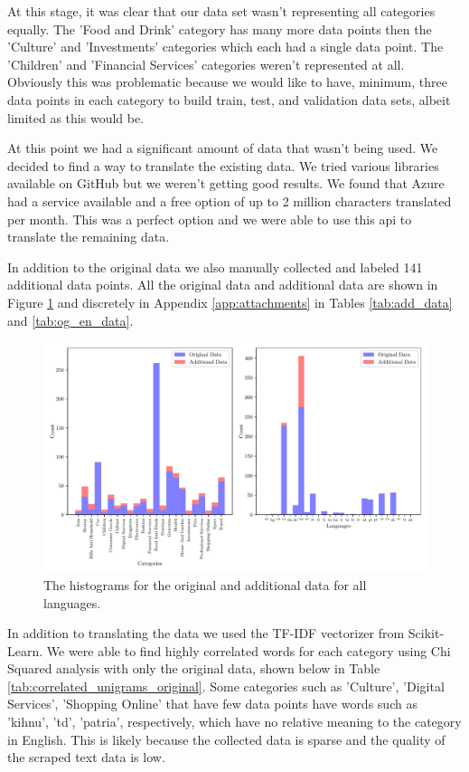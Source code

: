 At this stage, it was clear that our data set wasn't representing all categories equally. The 'Food and Drink' category has many more data points then the 'Culture' and 'Investments' categories which each had a single data point. The 'Children' and 'Financial Services' categories weren't represented at all. Obviously this was problematic because we would like to have, minimum, three data points in each category to build train, test, and validation data sets, albeit limited as this would be.

At this point we had a significant amount of data that wasn't being used. We decided to find a way to translate the existing data. We tried various libraries available on GitHub but we weren't getting good results. We found that Azure had a service available and a free option of up to 2 million characters translated per month. This was a perfect option and we were able to use this api to translate the remaining data.

In addition to the original data we also manually collected and labeled 141 additional data points. All the original data and additional data are shown in Figure \ref{fig:all_hist} and discretely in Appendix \ref{app:attachments} in Tables \ref{tab:add_data} and \ref{tab:og_en_data}.


\begin{figure}[!ht]
  \centering
  \includegraphics[width=\textwidth]{../img/plot_all_hist.pdf}
  \caption{The histograms for the original and additional data for all languages.}
  \label{fig:all_hist}
\end{figure}


In addition to translating the data we used the TF-IDF vectorizer from Scikit-Learn. We were able to find highly correlated words for each category using Chi Squared analysis with only the original data, shown below in Table \ref{tab:correlated_unigrams_original}. Some categories such as 'Culture', 'Digital Services', 'Shopping Online' that have few data points have words such as 'kihnu', 'td', 'patria', respectively, which have no relative meaning to the category in English. This is likely because the collected data is sparse and the quality of the scraped text data is low.


